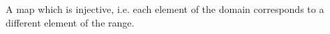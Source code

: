 A map which is injective, i.e. each element of the domain corresponds 
to a different element of the range.